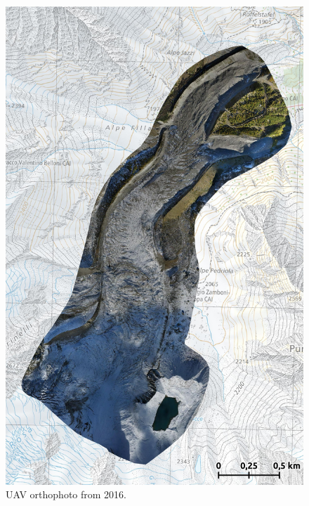 \begin{figure}[p]
    \centering
    \includegraphics[height=\textheight]{figures/appendix/orto_2016.jpg}
    \caption[]{UAV orthophoto from 2016.}
\end{figure}

